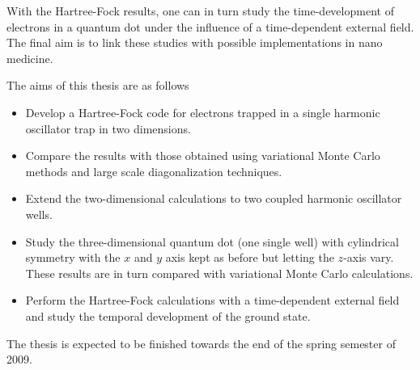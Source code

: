 With the Hartree-Fock results, one can in turn study the time-development of electrons in a quantum dot  under the influence
of a time-dependent external field.  The final aim  is to link these studies with possible implementations in nano medicine.


The aims of this thesis are as follows

\begin{itemize}
\item Develop a Hartree-Fock code for electrons trapped in a single harmonic oscillator trap in two dimensions.
\item Compare the results with those obtained using variational Monte Carlo methods and large scale diagonalization techniques.
\item Extend the two-dimensional calculations to two coupled harmonic oscillator wells.
 \item Study the three-dimensional quantum dot (one single well) 
with cylindrical symmetry with the $x$ and $y$ axis kept as before
but letting the $z$-axis vary. These results are in turn compared with variational Monte Carlo
calculations.
\item Perform the Hartree-Fock calculations with a time-dependent external field and study the temporal development of
the ground state.
\end{itemize}
 


The thesis is expected to be finished towards the end  of the spring
semester of 2009.




